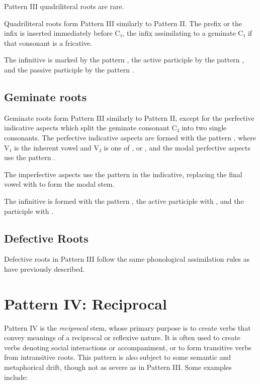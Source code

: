 \documentclass[grammar]{subfiles}
\begin{document}
Pattern III quadriliteral roots are rare. 

Quadriliteral roots form Pattern III similarly to Pattern II. The prefix
 or the infix  is inserted immediately before C₁, the infix
assimilating to a geminate C₁ if that consonant is a fricative. 

The infinitive is marked by the pattern , the active participle
by the pattern , and the passive participle by the pattern
.


\subsection{Geminate roots}
\label{ssec:vm:iii_geminate_roots}

Geminate roots form Pattern III similarly to Pattern II, except for the
perfective indicative aspects which split the geminate consonant C₂ into two
single consonants.   The perfective indicative aspects are formed with the
pattern , where V₁ is the inherent vowel and V₂ is one of
,  or , and the modal perfective aspects use the pattern
.  

The imperfective aspects use the pattern  in the indicative,
replacing the final vowel with  to form the modal stem. 

The infinitive is formed with the pattern , the active participle
with , and the participle with .  



\subsection{Defective Roots}
\label{ssec:vm:iii_defective_roots}

Defective roots in Pattern III follow the same phonological assimilation rules
as have previously described. 


\clearpage
\section{Pattern IV: Reciprocal}
\label{sec:vm:pattern_iv}

Pattern IV is the \emph{reciprocal} stem, whose primary purpose is to create
verbs that convey meanings of a reciprocal or reflexive nature.  It is often
used to create verbs denoting social interactions or accompaniment, or to form
transitive verbs from intransitive roots.  This pattern is also subject to some
semantic and metaphorical drift, though not as severe as in Pattern III. Some
examples include:
\end{document}
